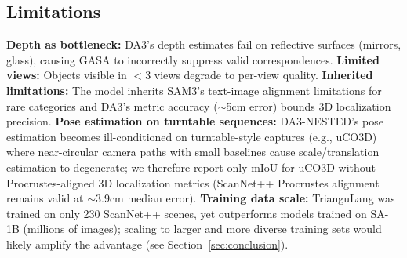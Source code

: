 \subsection{Limitations}

\textbf{Depth as bottleneck:} DA3's depth estimates fail on reflective surfaces (mirrors, glass), causing GASA to incorrectly suppress valid correspondences. \textbf{Limited views:} Objects visible in $<$3 views degrade to per-view quality. \textbf{Inherited limitations:} The model inherits SAM3's text-image alignment limitations for rare categories and DA3's metric accuracy ($\sim$5cm error) bounds 3D localization precision. \textbf{Pose estimation on turntable sequences:} DA3-NESTED's pose estimation becomes ill-conditioned on turntable-style captures (e.g., uCO3D) where near-circular camera paths with small baselines cause scale/translation estimation to degenerate; we therefore report only mIoU for uCO3D without Procrustes-aligned 3D localization metrics (ScanNet++ Procrustes alignment remains valid at $\sim$3.9cm median error). \textbf{Training data scale:} TrianguLang was trained on only 230 ScanNet++ scenes, yet outperforms models trained on SA-1B (millions of images); scaling to larger and more diverse training sets would likely amplify the advantage (see Section~\ref{sec:conclusion}).
